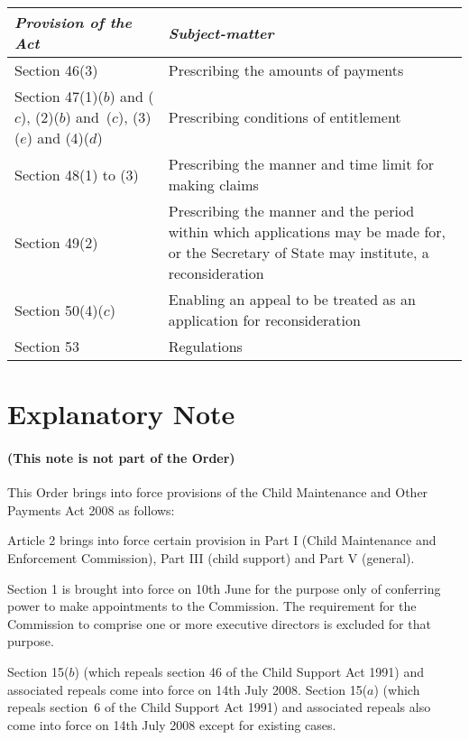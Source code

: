 \documentclass[12pt,a4paper]{article}
\begin{document}
\renewcommand\parthead{— Schedule}

\begin{longtable}{p{101.10304pt}p{264.90263pt}}
\hline
\itshape Provision of the Act	& \itshape Subject-matter\\
\hline
\endhead
\hline
\endlastfoot
Section 46(3)	&Prescribing the amounts of payments\\
Section 47(1)($b$)  and ($c$), (2)($b$)  and~($c$), (3)($e$)  and (4)($d$) 	&Prescribing conditions of entitlement\\
Section 48(1) to (3)	&Prescribing the manner and time limit for making claims\\
Section 49(2)	&Prescribing the manner and the period within which applications may be made for, or the Secretary of State may institute, a reconsideration\\
Section 50(4)($c$) 	&Enabling an appeal to be treated as an application for reconsideration\\
Section 53	&Regulations\\
\end{longtable}

\part{Explanatory Note}

\renewcommand\parthead{— Explanatory Note}

\subsection*{(This note is not part of the Order)}

This Order brings into force provisions of the Child Maintenance and Other Payments Act 2008 as follows:

Article 2 brings into force certain provision in Part I (Child Maintenance and Enforcement Commission), Part III (child support) and Part V (general).

Section 1 is brought into force on 10th June for the purpose only of conferring power to make appointments to the Commission. The requirement for the Commission to comprise one or more executive directors is excluded for that purpose.

Section 15($b$)  (which repeals section 46 of the Child Support Act 1991) and associated repeals come into force on 14th July 2008. Section 15($a$)  (which repeals section~6 of the Child Support Act 1991) and associated repeals also come into force on 14th July 2008 except for existing cases.
\end{document}
